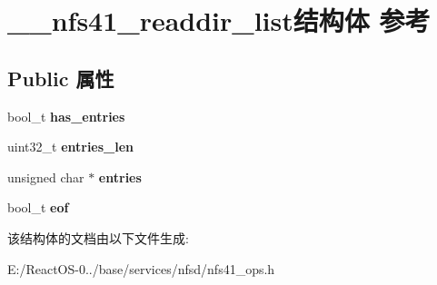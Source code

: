 \hypertarget{struct____nfs41__readdir__list}{}\section{\+\_\+\+\_\+nfs41\+\_\+readdir\+\_\+list结构体 参考}
\label{struct____nfs41__readdir__list}
\subsection*{Public 属性}
\begin{DoxyCompactItemize}
\item 
\mbox{\label{struct____nfs41__readdir__list_a2071d474981f0c00d6734a4919e7c661}} 
bool\+\_\+t {\bfseries has\+\_\+entries}
\item 
\mbox{\label{struct____nfs41__readdir__list_a1882e9becf36195478c4d08239f234f8}} 
uint32\+\_\+t {\bfseries entries\+\_\+len}
\item 
\mbox{\label{struct____nfs41__readdir__list_a451efe4da707e5d68a8fa1a2ebe05139}} 
unsigned char $\ast$ {\bfseries entries}
\item 
\mbox{\label{struct____nfs41__readdir__list_a91d2c7fbfcbea10d0adeae9355008bd0}} 
bool\+\_\+t {\bfseries eof}
\end{DoxyCompactItemize}


该结构体的文档由以下文件生成\+:\begin{DoxyCompactItemize}
\item 
E\+:/\+React\+O\+S-\/0../base/services/nfsd/nfs41\+\_\+ops.\+h\end{DoxyCompactItemize}
